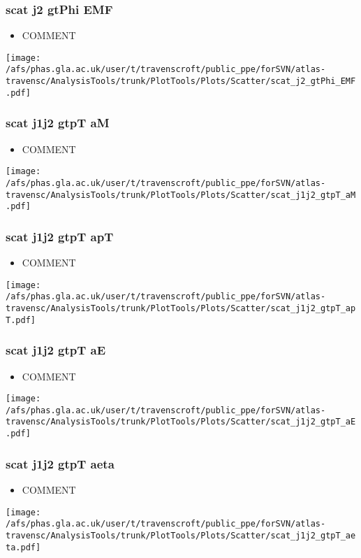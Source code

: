 \documentclass{beamer}
\begin{document}
\begin{frame}
\frametitle{scat j2 gtPhi EMF}
\begin{itemize}
\item COMMENT
\end{itemize}
\begin{center}
\texttt{[image: /afs/phas.gla.ac.uk/user/t/travenscroft/public\_ppe/forSVN/atlas-travensc/AnalysisTools/trunk/PlotTools/Plots/Scatter/scat\_j2\_gtPhi\_EMF.pdf]}
\end{center}
\end{frame}

\begin{frame}
\frametitle{scat j1j2 gtpT aM}
\begin{itemize}
\item COMMENT
\end{itemize}
\begin{center}
\texttt{[image: /afs/phas.gla.ac.uk/user/t/travenscroft/public\_ppe/forSVN/atlas-travensc/AnalysisTools/trunk/PlotTools/Plots/Scatter/scat\_j1j2\_gtpT\_aM.pdf]}
\end{center}
\end{frame}

\begin{frame}
\frametitle{scat j1j2 gtpT apT}
\begin{itemize}
\item COMMENT
\end{itemize}
\begin{center}
\texttt{[image: /afs/phas.gla.ac.uk/user/t/travenscroft/public\_ppe/forSVN/atlas-travensc/AnalysisTools/trunk/PlotTools/Plots/Scatter/scat\_j1j2\_gtpT\_apT.pdf]}
\end{center}
\end{frame}

\begin{frame}
\frametitle{scat j1j2 gtpT aE}
\begin{itemize}
\item COMMENT
\end{itemize}
\begin{center}
\texttt{[image: /afs/phas.gla.ac.uk/user/t/travenscroft/public\_ppe/forSVN/atlas-travensc/AnalysisTools/trunk/PlotTools/Plots/Scatter/scat\_j1j2\_gtpT\_aE.pdf]}
\end{center}
\end{frame}

\begin{frame}
\frametitle{scat j1j2 gtpT aeta}
\begin{itemize}
\item COMMENT
\end{itemize}
\begin{center}
\texttt{[image: /afs/phas.gla.ac.uk/user/t/travenscroft/public\_ppe/forSVN/atlas-travensc/AnalysisTools/trunk/PlotTools/Plots/Scatter/scat\_j1j2\_gtpT\_aeta.pdf]}
\end{center}
\end{frame}
\end{document}
